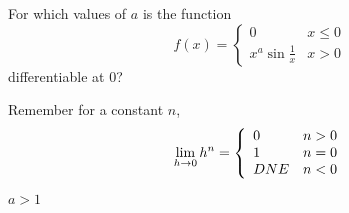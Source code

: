 \begin{question}[2009H]
 For which values of $a$ is the function
\[
f(x) =\left\{\begin{array}{ll}
	0 & x\le 0\\
             x^a \sin\frac{1}{x} & x > 0\end{array}\right.
\]
differentiable at 0?
\end{question}
\begin{hint}
Remember for a constant $n$, \[\displaystyle\lim_{h \to 0} h^{n} = \left\{\begin{array}{ll}
0&n>0\\
1&n=0\\
DNE&n<0
\end{array}\right.\]
\end{hint}
\begin{answer} $a>1$
\end{answer}
